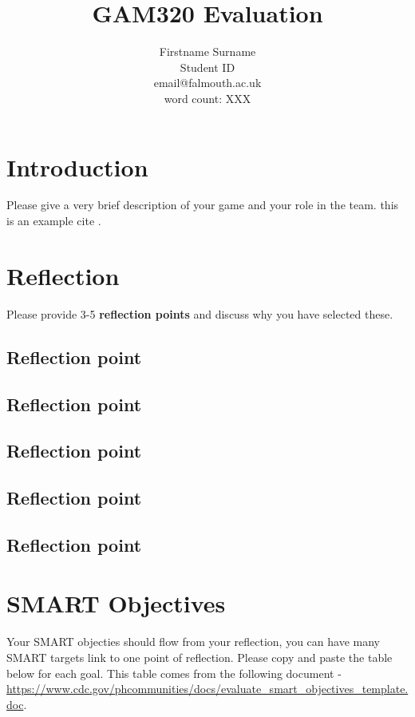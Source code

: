 \documentclass{article}
\begin{document}
    \title{GAM320 Evaluation}
    \author{Firstname Surname \\
        \large{Student ID} \\
        \large{email@falmouth.ac.uk} \\
        \large{word count: XXX}}
    \date{}

    \maketitle

    \section{Introduction}
        Please give a very brief description of your game and your role in the team. this is an example cite \cite{example}.

    \section{Reflection}
        Please provide 3-5 \textbf{reflection points} and discuss why you have selected these.
        \subsection{Reflection point}

        \subsection{Reflection point}

        \subsection{Reflection point}

        \subsection{Reflection point}

        \subsection{Reflection point}

    \section{SMART Objectives}
        Your SMART objecties should flow from your reflection, you can have many SMART targets link to one point of reflection. Please copy and paste the table below for each goal. This table comes from the following document - \url{https://www.cdc.gov/phcommunities/docs/evaluate_smart_objectives_template.doc}.
\end{document}
